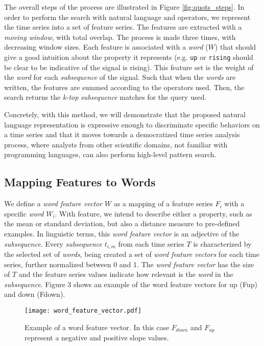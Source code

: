 The overall steps of the process are illustrated in Figure \ref{fig:quots_steps}. In order to perform the search with natural language and operators, we represent the time series into a set of feature series. The features are extracted with a \textit{moving window}, with total overlap. The process is made three times, with decreasing window sizes. Each feature is associated with a \textit{word} ($W$) that should give a good intuition about the property it represents (e.g. \texttt{up} or \texttt{rising} should be clear to be indicative of the signal is rising). This feature set is the weight of the \textit{word} for each \textit{subsequence} of the signal. Such that when the \textit{words} are written, the features are summed according to the operators used. Then, the search returns the \textit{k-top} \textit{subsequence} matches for the query used.
\par
Concretely, with this method, we will demonstrate that the proposed natural language representation is expressive enough to discriminate specific behaviors on a time series and that it moves towards a democratized time series analysis process, where analysts from other scientific domains, not familiar with programming languages, can also perform high-level pattern search.

\subsection{Mapping Features to Words}

We define a \textit{word feature vector} $W$ as a mapping of a feature series $F_i$ with a specific \textit{word} $W_i$. With feature, we intend to describe either a property, such as the mean or standard deviation, but also a distance measure to pre-defined examples. In linguistic terms, this \textit{word feature vector} is an adjective of the \textit{subsequence}. Every \textit{subsequence} $t_{i,m}$ from each time series $T$ is characterized by the selected set of \textit{words},  being created a set of \textit{word feature vectors} for each time series, further normalized between 0 and 1. The \textit{word feature vector} has the size of $T$ and the feature series values indicate how relevant is the \textit{word} in the \textit{subsequence}. Figure 3 shows an example of the word feature vectors for \textcolor{myblue4}{up (Fup)} and \textcolor{myblue3}{down (Fdown)}.

\begin{figure}[!h]
\centering
\texttt{[image: word\_feature\_vector.pdf]}
\caption{Example of a word feature vector. In this case $F_{down}$ and $F_{up}$ represent a negative and positive slope values.}
\label{fig:wfv_example}
\end{figure}

